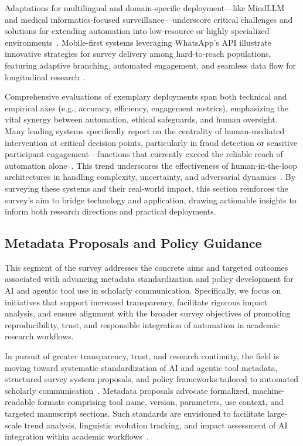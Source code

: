 \documentclass[sigconf]{acmart}
\begin{document}
Adaptations for multilingual and domain-specific deployment—like MindLLM and medical informatics-focused surveillance—underscore critical challenges and solutions for extending automation into low-resource or highly specialized environments~\cite{ref92,ref94,ref95,ref100}. Mobile-first systems leveraging WhatsApp’s API illustrate innovative strategies for survey delivery among hard-to-reach populations, featuring adaptive branching, automated engagement, and seamless data flow for longitudinal research~\cite{ref104,ref112,ref113,ref114,ref115,ref117}.

Comprehensive evaluations of exemplary deployments span both technical and empirical axes (e.g., accuracy, efficiency, engagement metrics), emphasizing the vital synergy between automation, ethical safeguards, and human oversight. Many leading systems specifically report on the centrality of human-mediated intervention at critical decision points, particularly in fraud detection or sensitive participant engagement—functions that currently exceed the reliable reach of automation alone~\cite{ref93,ref112,ref113,ref114,ref115,ref117}. This trend underscores the effectiveness of human-in-the-loop architectures in handling complexity, uncertainty, and adversarial dynamics~\cite{ref85,ref86,ref91,ref94,ref95,ref117}. By surveying these systems and their real-world impact, this section reinforces the survey’s aim to bridge technology and application, drawing actionable insights to inform both research directions and practical deployments.

\subsection{Metadata Proposals and Policy Guidance}

This segment of the survey addresses the concrete aims and targeted outcomes associated with advancing metadata standardization and policy development for AI and agentic tool use in scholarly communication. Specifically, we focus on initiatives that support increased transparency, facilitate rigorous impact analysis, and ensure alignment with the broader survey objectives of promoting reproducibility, trust, and responsible integration of automation in academic research workflows.

In pursuit of greater transparency, trust, and research continuity, the field is moving toward systematic standardization of AI and agentic tool metadata, structured survey system proposals, and policy frameworks tailored to automated scholarly communication~\cite{ref106}\cite{ref111}\cite{ref117}. Metadata proposals advocate formalized, machine-readable formats comprising tool name, version, parameters, use context, and targeted manuscript sections. Such standards are envisioned to facilitate large-scale trend analysis, linguistic evolution tracking, and impact assessment of AI integration within academic workflows~\cite{ref106}.
\end{document}
